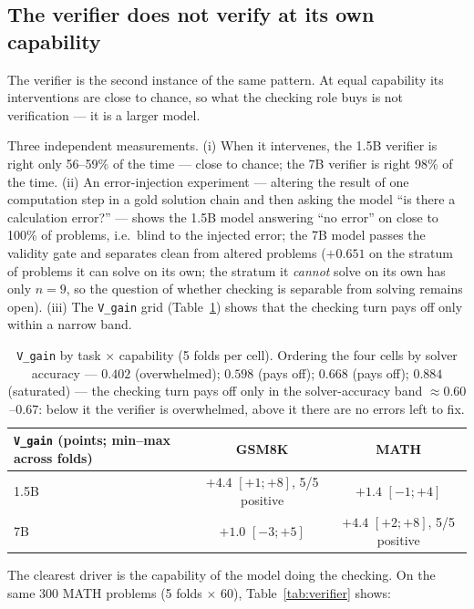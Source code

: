 \documentclass[11pt,a4paper]{article}
\begin{document}
\subsection{The verifier does not verify at its own capability}\label{sec:verifierrole}

The verifier is the second instance of the same pattern. At equal capability its interventions are close to chance, so what the checking role buys is not verification --- it is a larger model.

Three independent measurements. (i) When it intervenes, the 1.5B verifier is right only 56--59\% of the time --- close to chance; the 7B verifier is right 98\% of the time. (ii) An error-injection experiment --- altering the result of one computation step in a gold solution chain and then asking the model ``is there a calculation error?'' --- shows the 1.5B model answering ``no error'' on close to 100\% of problems, i.e.\ blind to the injected error; the 7B model passes the validity gate and separates clean from altered problems ($+0.651$ on the stratum of problems it can solve on its own; the stratum it \emph{cannot} solve on its own has only $n=9$, so the question of whether checking is separable from solving remains open). (iii) The \texttt{V\_gain} grid (Table~\ref{tab:vgaingrid}) shows that the checking turn pays off only within a narrow band.

\begin{table}[h]\centering\small
\begin{tabular}{@{}l c c@{}}
\toprule
\texttt{V\_gain} (points; min--max across folds) & GSM8K & MATH\\
\midrule
1.5B & $+4.4$ $[+1;+8]$, 5/5 positive & $+1.4$ $[-1;+4]$\\
7B   & $+1.0$ $[-3;+5]$ & $+4.4$ $[+2;+8]$, 5/5 positive\\
\bottomrule
\end{tabular}
\caption{\texttt{V\_gain} by task $\times$ capability (5 folds per cell). Ordering the four cells by
solver accuracy --- $0.402$ (overwhelmed); $0.598$ (pays off); $0.668$ (pays off); $0.884$
(saturated) --- the checking turn pays off only in the solver-accuracy band $\approx 0.60$--$0.67$:
below it the verifier is overwhelmed, above it there are no errors left to fix.}
\label{tab:vgaingrid}
\end{table}

The clearest driver is the capability of the model doing the checking. On the same 300 MATH problems (5 folds $\times$ 60), Table~\ref{tab:verifier} shows:
\end{document}
